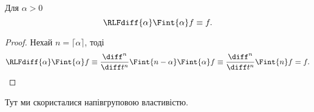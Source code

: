 
\begin{th_formula}
    Для $\alpha > 0$
    \begin{equation}
        \RLFdiff{\alpha} \Fint{\alpha} f \equiv f.
    \end{equation}
\end{th_formula}

\begin{proof}
    Нехай $n = \lceil \alpha \rceil$, тоді
    \begin{equation}
        \RLFdiff{\alpha} \Fint{\alpha} f \equiv \frac{\diff^n}{\diff t^n} \Fint{n - \alpha} \Fint{\alpha} f \equiv \frac{\diff^n}{\diff t^n} \Fint{n} f = f. 
    \end{equation}
\end{proof}

\begin{remark}
    Тут ми скористалися напівгруповою властивістю.
\end{remark}

